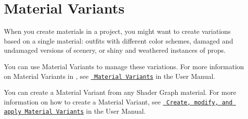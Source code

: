 \chapter{Material Variants}
\hypertarget{md__hey_tea_9_2_library_2_package_cache_2com_8unity_8shadergraph_0d14_80_88_2_documentation_0i_2materialvariant-_s_g}{}\label{md__hey_tea_9_2_library_2_package_cache_2com_8unity_8shadergraph_0d14_80_88_2_documentation_0i_2materialvariant-_s_g}
\label{md__hey_tea_9_2_library_2_package_cache_2com_8unity_8shadergraph_0d14_80_88_2_documentation_0i_2materialvariant-_s_g_autotoc_md3439}%
%
 When you create materials in a project, you might want to create variations based on a single material\+: outfits with different color schemes, damaged and undamaged versions of scenery, or shiny and weathered instances of props.

You can use Material Variants to manage these variations. For more information on Material Variants in , see \href{https://docs.unity3d.com/2022.2/Documentation/Manual/materialvariant-landingpage.html}{\texttt{ Material Variants}} in the  User Manual.

You can create a Material Variant from any Shader Graph material. For more information on how to create a Material Variant, see \href{https://docs.unity3d.com/2022.2/Documentation/Manual/materialvariant-tasks.html}{\texttt{ Create, modify, and apply Material Variants}} in the User Manual. 